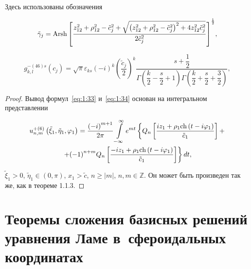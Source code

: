 \begin{russian}
\begin{theorem}
Здесь использованы обозначения

\begin{equation}\label{eq:1:35}
{\tilde \gamma _j} = {\rm{Arsh}}{\mkern 1mu} {\kern 1pt} {\left[ {\frac{{z_{12}^2 + \rho _{12}^2 - \tilde c_j^2 + \sqrt {\left( {z_{12}^2 + \rho _{12}^2 - \tilde c_j^2} \right)^2 + 4z_{12}^2\tilde c_j^2} }}{{2\tilde c_j^2}}} \right]^{\frac{1}{2}}},
\end{equation}

\begin{equation}\label{eq:1:36}
g_{k,l}^{ - (46)s}({c_j}) = \sqrt \pi  {\varepsilon _{ks}}{( - i)^k}{\left( {\dfrac{{{{\tilde c}_j}}}{2}} \right)^k}\dfrac{{s + \dfrac{1}{2}}}{{\Gamma \left( {\dfrac{k}{2} - \dfrac{s}{2} + 1} \right)\Gamma \left( {\dfrac{k}{2} + \dfrac{s}{2} + \dfrac{3}{2}} \right)}},
\end{equation}

\end{theorem}

\begin{proof}
Вывод формул~\eqref{eq:1:33} и~\eqref{eq:1:34} основан на интегральном представлении~\cite{Nikolaev1998-1}

\begin{multline}\label{eq:1:37}
u_{n,m}^{ + (6)}\left( {{{\tilde \xi }_1},{{\tilde \eta }_1},{\varphi _1}} \right) = \frac{{{{( - i)}^{m + 1}}}}{{2\pi }}\int\limits_{ - \infty }^\infty  {{e^{mt}}} \left\{ {{Q_n}\left[ {\frac{{i{z_1} + {\rho _1}{\mathop{\rm ch}\nolimits} \left( {t - i{\varphi _1}} \right)}}{{{{\tilde c}_1}}}} \right] + } \right.\\
\left. { + {{( - 1)}^{n + m}}{Q_n}\left[ {\frac{{ - i{z_1} + {\rho _1}{\mathop{\rm ch}\nolimits} \left( {t - i{\varphi _1}} \right)}}{{{{\tilde c}_1}}}} \right]} \right\}dt,
\end{multline}

\noindent ${\tilde \xi _1} > 0$, ${\tilde \eta _1} \in (0,\pi )$, ${x_1} > \tilde c$, $n \ge |m|$, $n,m\in\mathbb{Z}$. Он может быть произведен так же, как в теореме 1.1.3.
\end{proof}

\section[Теоремы сложения базисных решений уравнения Ламе в сфероидальных координатах]{Теоремы сложения базисных решений уравнения Ламе в~сфероидальных координатах
}


\end{russian}
